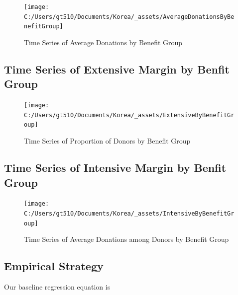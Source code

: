 \documentclass[ review  , 3p ]{elsarticle}
\begin{document}
  \begin{figure}
  
  {\centering \texttt{[image: C:/Users/gt510/Documents/Korea/\_assets/AverageDonationsByBenefitGroup]} 
  
  }
  
  \caption{Time Series of Average Donations by Benefit Group}\label{fig:unnamed-chunk-3}
  \end{figure}
  
  \hypertarget{time-series-of-extensive-margin-by-benfit-group}{%
  \subsection{Time Series of Extensive Margin by Benfit Group}\label{time-series-of-extensive-margin-by-benfit-group}}
  
  \begin{figure}
  
  {\centering \texttt{[image: C:/Users/gt510/Documents/Korea/\_assets/ExtensiveByBenefitGroup]} 
  
  }
  
  \caption{Time Series of Proportion of Donors by Benefit Group}\label{fig:unnamed-chunk-4}
  \end{figure}
  
  \hypertarget{time-series-of-intensive-margin-by-benfit-group}{%
  \subsection{Time Series of Intensive Margin by Benfit Group}\label{time-series-of-intensive-margin-by-benfit-group}}
  
  \begin{figure}
  
  {\centering \texttt{[image: C:/Users/gt510/Documents/Korea/\_assets/IntensiveByBenefitGroup]} 
  
  }
  
  \caption{Time Series of Average Donations among Donors by Benefit Group}\label{fig:unnamed-chunk-5}
  \end{figure}
  
  \hypertarget{empirical-strategy}{%
  \subsection{Empirical Strategy}\label{empirical-strategy}}
  
  Our baseline regression equation is
  
\end{document}
